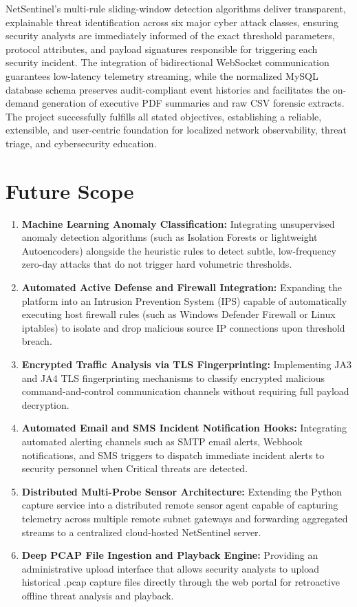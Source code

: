 \documentclass[a4paper,12pt]{report}
\begin{document}
	NetSentinel's multi-rule sliding-window detection algorithms deliver transparent, explainable threat identification across six major cyber attack classes, ensuring security analysts are immediately informed of the exact threshold parameters, protocol attributes, and payload signatures responsible for triggering each security incident. The integration of bidirectional WebSocket communication guarantees low-latency telemetry streaming, while the normalized MySQL database schema preserves audit-compliant event histories and facilitates the on-demand generation of executive PDF summaries and raw CSV forensic extracts. The project successfully fulfills all stated objectives, establishing a reliable, extensible, and user-centric foundation for localized network observability, threat triage, and cybersecurity education.
	
	\section{Future Scope}
	\begin{enumerate}
		\item \textbf{Machine Learning Anomaly Classification:}
		Integrating unsupervised anomaly detection algorithms (such as Isolation Forests or lightweight Autoencoders) alongside the heuristic rules to detect subtle, low-frequency zero-day attacks that do not trigger hard volumetric thresholds.
		
		\item \textbf{Automated Active Defense and Firewall Integration:}
		Expanding the platform into an Intrusion Prevention System (IPS) capable of automatically executing host firewall rules (such as Windows Defender Firewall or Linux iptables) to isolate and drop malicious source IP connections upon threshold breach.
		
		\item \textbf{Encrypted Traffic Analysis via TLS Fingerprinting:}
		Implementing JA3 and JA4 TLS fingerprinting mechanisms to classify encrypted malicious command-and-control communication channels without requiring full payload decryption.
		
		\item \textbf{Automated Email and SMS Incident Notification Hooks:}
		Integrating automated alerting channels such as SMTP email alerts, Webhook notifications, and SMS triggers to dispatch immediate incident alerts to security personnel when Critical threats are detected.
		
		\item \textbf{Distributed Multi-Probe Sensor Architecture:}
		Extending the Python capture service into a distributed remote sensor agent capable of capturing telemetry across multiple remote subnet gateways and forwarding aggregated streams to a centralized cloud-hosted NetSentinel server.
		
		\item \textbf{Deep PCAP File Ingestion and Playback Engine:}
		Providing an administrative upload interface that allows security analysts to upload historical .pcap capture files directly through the web portal for retroactive offline threat analysis and playback.
	\end{enumerate}
	
\end{document}

